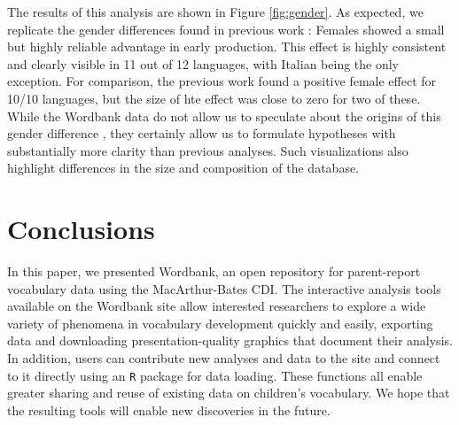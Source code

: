 \documentclass[man,noapacite]{apa}
\begin{document}
The results of this analysis are shown in Figure \ref{fig:gender}. As expected, we replicate the gender differences found in previous work \cite{eriksson2012}: Females showed a small but highly reliable advantage in early production. This effect is highly consistent and clearly visible in 11 out of 12 languages, with Italian being the only exception. For comparison, the previous work found a positive female effect for 10/10 languages, but the size of hte effect was close to zero for two of these. While the Wordbank data do not allow us to speculate about the origins of this gender difference \cite<for some discussion, see>{eriksson2012}, they certainly allow us to formulate hypotheses with substantially more clarity than previous analyses. Such visualizations also highlight differences in the size and composition of the database.

\section{Conclusions}

In this paper, we presented Wordbank, an open repository for parent-report vocabulary data using the MacArthur-Bates CDI. The interactive analysis tools available on the Wordbank site allow interested researchers to explore a wide variety of phenomena in vocabulary development quickly and easily, exporting data and downloading presentation-quality graphics that document their analysis. In addition, users can contribute new analyses and data to the site and connect to it directly using an \texttt{R} package for data loading. These functions all enable greater sharing and reuse of existing data on children's vocabulary. We hope that the resulting tools will enable new discoveries in the future.



\end{document}
